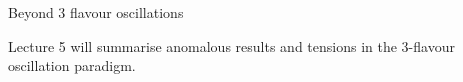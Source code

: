 \begin{frame}{Beyond 3 flavour oscillations}
  \begin{block}{}
  {\scriptsize
   Lecture 5 will summarise anomalous results and tensions in the
   3-flavour oscillation paradigm.\\
  }
  \end{block}

\end{frame}

%
%
%

